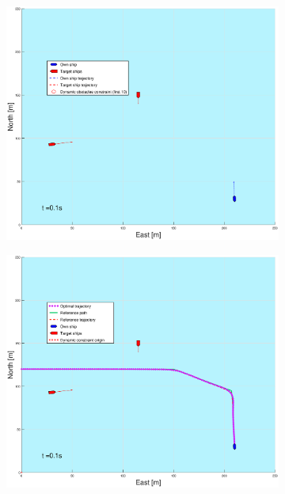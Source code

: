 \clearpage
\begin{figure}[!b] %
    \begin{subfigure}[b]{0.49\textwidth}
        \centering
        \includegraphics[width=\textwidth]{Images/Figures/Havn1/_Simple_0fig1_time=0}
    \end{subfigure}
    \hfill
    \begin{subfigure}[b]{0.499\textwidth}
        \centering
        \includegraphics[width=\textwidth]{Images/Figures/Havn1/_Simple_0fig999_time=0}

\end{subfigure}
\end{figure}
